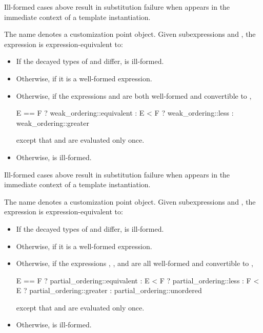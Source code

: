 \begin{note}
Ill-formed cases above result in substitution failure
when  appears in the immediate context
of a template instantiation.
\end{note}

%
\pnum
The name  denotes
a customization point object.
Given subexpressions  and ,
the expression 
is expression-equivalent to:
\begin{itemize}
\item
  If the decayed types of  and  differ,
   is ill-formed.
\item
  Otherwise,  if it is a well-formed expression.
\item
  Otherwise, if the expressions  and 
  are both well-formed and convertible to ,
\begin{codeblock}
E == F ? weak_ordering::equivalent :
E < F  ? weak_ordering::less :
         weak_ordering::greater
\end{codeblock}
except that  and  are evaluated only once.
\item
  Otherwise,  is ill-formed.
\end{itemize}

\begin{note}
Ill-formed cases above result in substitution failure
when  appears in the immediate context
of a template instantiation.
\end{note}

%
\pnum
The name  denotes
a customization point object.
Given subexpressions  and ,
the expression 
is expression-equivalent to:
\begin{itemize}
\item
  If the decayed types of  and  differ,
   is ill-formed.
\item
  Otherwise,  if it is a well-formed expression.
\item
  Otherwise, if the expressions
  , , and 
  are all well-formed and convertible to ,
\begin{codeblock}
E == F ? partial_ordering::equivalent :
E < F  ? partial_ordering::less :
F < E  ? partial_ordering::greater :
         partial_ordering::unordered
\end{codeblock}
except that  and  are evaluated only once.
\item
  Otherwise,  is ill-formed.
\end{itemize}

